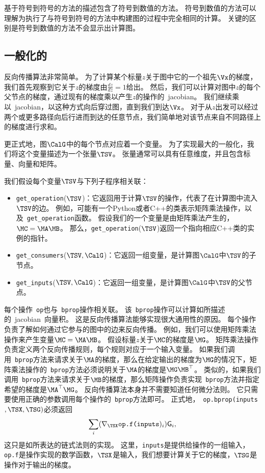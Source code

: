 基于符号到符号的方法的描述包含了符号到数值的方法。
符号到数值的方法可以理解为执行了与符号到符号的方法中构建图的过程中完全相同的计算。
关键的区别是符号到数值的方法不会显示出计算图。

\subsection{一般化的}
\label{sec:general_back_propagation}

反向传播算法非常简单。
为了计算某个标量$z$关于图中它的一个祖先$\Vx$的梯度，我们首先观察到它关于$z$的梯度由$\frac{dz}{dz}=1$给出。
然后，我们可以计算对图中$z$的每个父节点的梯度，通过现有的梯度乘以产生$z$的操作的~\gls{jacobian}。
我们继续乘以~\gls{jacobian}，以这种方式向后穿过图，直到我们到达$\Vx$。
对于从$z$出发可以经过两个或更多路径向后行进而到达的任意节点，我们简单地对该节点来自不同路径上的梯度进行求和。

更正式地，图$\CalG$中的每个节点对应着一个变量。
为了实现最大的一般化，我们将这个变量描述为一个张量$\TSV$。
张量通常可以具有任意维度，并且包含标量、向量和矩阵。

我们假设每个变量$\TSV$与下列子程序相关联：
\begin{itemize}
    \item \verb|get_operation|($\TSV$)：它返回用于计算$\TSV$的操作，代表了在计算图中流入$\TSV$的边。
    例如，可能有一个Python或者C++的类表示矩阵乘法操作，以及~\verb|get_operation|函数。
    假设我们的一个变量是由矩阵乘法产生的，$\MC=\MA\MB$。
    那么，\verb|get_operation|($\TSV$)返回一个指向相应C++类的实例的指针。

    \item \verb|get_consumers|($\TSV, \CalG$)：它返回一组变量，是计算图$\CalG$中$\TSV$的子节点。

    \item \verb|get_inputs|($\TSV, \CalG$)：它返回一组变量，是计算图$\CalG$中$\TSV$的父节点。
\end{itemize}

  
每个操作~\verb|op|也与~\verb|bprop|操作相关联。
该~\verb|bprop|操作可以计算如所描述的~\gls{jacobian}~向量积。
这是反向传播算法能够实现很大通用性的原因。
每个操作负责了解如何通过它参与的图中的边来反向传播。
例如，我们可以使用矩阵乘法操作来产生变量$\MC=\MA\MB$。
假设标量$z$关于$\MC$的梯度是$\MG$。
矩阵乘法操作负责定义两个反向传播规则，每个规则对应于一个输入变量。
如果我们调用~\verb|bprop|方法来请求关于$\MA$的梯度，那么在给定输出的梯度为$\MG$的情况下，矩阵乘法操作的~\verb|bprop|方法必须说明关于$\MA$的梯度是$\MG\MB^\top$。
类似的，如果我们调用~\verb|bprop|方法来请求关于$\MB$的梯度，那么矩阵操作负责实现~\verb|bprop|方法并指定希望的梯度是$\MA^\top\MG$。
反向传播算法本身并不需要知道任何微分法则。
它只需要使用正确的参数调用每个操作的~\verb|bprop|方法即可。
正式地，~\verb|op.bprop(inputs|$, \TSX, \TSG)$必须返回
\begin{equation}
  \sum_i (\nabla_{\TSX} \verb|op.f(inputs|)_i) \textsf{G}_i,
\end{equation}
这只是如所表达的链式法则的实现。
这里，\verb|inputs|是提供给操作的一组输入，\verb|op.f|是操作实现的数学函数，$\TSX$是输入，我们想要计算关于它的梯度，$\TSG$是操作对于输出的梯度。

